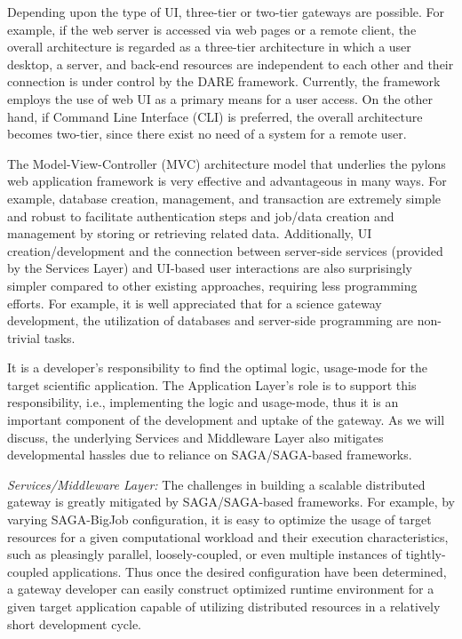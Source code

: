 \documentclass{sig-alternate}
\begin{document}
Depending upon the type of UI, three-tier or two-tier gateways are
possible.  For example, if the web server is accessed via web pages or
a remote client, the overall architecture is regarded as a three-tier
architecture in which a user desktop, a server, and back-end resources
are independent to each other and their connection is under control by
the DARE framework.  Currently, the framework employs the use of web
UI as a primary means for a user access.  On the other hand, if
Command Line Interface (CLI) is preferred, the overall architecture
becomes two-tier, since there exist no need of a system for a remote
user.  %

The Model-View-Controller (MVC) architecture model that underlies the
pylons web application framework\cite{pylonsurl} is very effective and advantageous in
many ways. For example, database creation, management, and transaction
are extremely simple and robust to facilitate authentication steps and
job/data creation and management by storing or retrieving related
data.  Additionally, UI creation/development and the connection
between server-side services (provided by the Services Layer) and
UI-based user interactions are also surprisingly simpler compared to
other existing approaches, requiring less programming efforts.  For
example, it is well appreciated that for a science gateway
development, the utilization of databases and server-side programming
are non-trivial tasks.

It is a developer's responsibility to find the optimal logic,
usage-mode for the target scientific application.  The Application
Layer's role is to support this responsibility, i.e., implementing the
logic and usage-mode, thus it is an important component of the
development and uptake of the gateway. As we will discuss, the
underlying Services and Middleware Layer also mitigates developmental
hassles due to reliance on SAGA/SAGA-based frameworks.


\textit{Services/Middleware Layer:} The challenges in building a
scalable distributed gateway is greatly mitigated by SAGA/SAGA-based
frameworks.  For example, by varying SAGA-BigJob configuration, it is
easy to optimize the usage of target resources for a given
computational workload and their execution characteristics, such as
pleasingly parallel, loosely-coupled, or even multiple instances of
tightly-coupled applications.  Thus once the desired configuration
have been determined, a gateway developer can easily construct
optimized runtime environment for a given target application capable
of utilizing distributed resources in a relatively short development
cycle.
\end{document}
